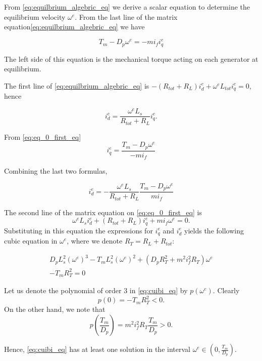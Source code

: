 \documentclass[letterpaper, 10 pt, conference]{ieeeconf}  %
\begin{document}
From \eqref{eq:equilbrium_algebric_eq} we derive a scalar
equation to determine the equilibrium velocity $\omega^{e}$.
From the last line of the matrix equation\eqref{eq:equilbrium_algebric_eq} we have

\begin{equation}
T_{m}-D_{p}\omega^{e}=-mi_{f}i_{q}^{e}\label{eq:eq_0_first_eq}
\end{equation}

The left side of this equation is the mechanical torque acting on each
generator at equilibrium.

The first line of  \eqref{eq:equilbrium_algebric_eq}
is $-\left(R_{tot}+R_{L}\right)i_{d}^{e}+\omega^{e}L_{tot}i_{q}^{e}=0$,
\quad hence

\[
i_{d}^{e}=\frac{\omega^{e}L_{s}}{R_{tot}+R_{L}}i_{q}^{e}.
\]

From \eqref{eq:eq_0_first_eq} 
\begin{equation}
i_{q}^{e}=\frac{T_{m}-D_{p}\omega^{e}}{-mi_{f}}\label{eq:iq_0_}
\end{equation}

Combining the last two formulas,

\begin{equation}
i_{d}^{e}=-\frac{\omega^{e}L_{s}}{R_{tot}+R_{L}}\frac{T_{m}-D_{p}\omega^{e}}{mi_{f}}\label{eq:id_0_}
\end{equation}

The second line of the matrix equation on \eqref{eq:eq_0_first_eq}
is 
$$\omega^{e}L_{s}i_{d}^{e}+\left(R_{tot}+R_{L}\right)i_{q}^{e}+mi_{f}\omega^{e}=0.$$
Substituting in this equation the expressions for $i_{q}^{e}$ and $i_{d}^{e}$ yields the following cubic equation in $\omega^e$, where we denote $R_T = R_L+R_{tot}$:

\begin{equation}
\begin{split}
D_{p}L_{s}^{2}\left(\omega^{e}\right)^{3}-T_{m}L_{s}^{2}\left(\omega^{e}\right)^{2} +\left(D_{p}R_T^{2}+m^{2}i_{f}^{2}R_T\right) \omega^{e} \\ -T_{m}R_T^{2}=0
\end{split}\label{eq:cuibi_eq}
\end{equation}

Let us denote the polynomial of order 3 in \eqref{eq:cuibi_eq} by
$p(\omega^{e})$. 
Clearly
$$p(0)=-T_{m}R_T^{2}<0.$$
On the other hand, we note that 
$$
p(\frac{T_{m}}{D_{p}}) =m^{2}i_{f}^{2}R_T\frac{T_{m}}{D_{p}}>0.
$$

Hence, \eqref{eq:cuibi_eq} has at least one solution in the interval
$\omega^{e}\in\left(0,\frac{T_{m}}{D_{p}}\right)$.
\end{document}
